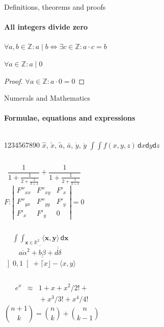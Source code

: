 \documentclass{beamer}
\begin{document}
  \begin{frame}[label=proof]{Definitions, theorems and proofs}
    \framesubtitle{All integers divide zero}
    \begin{definition}
      $\forall a,b\in\mathds{Z}: a\mid b\iff\exists c\in\mathds{Z}:a\cdot c=b$ 
    \end{definition}
    \begin{theorem}
      $\forall a\in\mathds{Z}: a\mid 0$
    \end{theorem}
    \begin{proof}[Proof\nopunct]
      $\forall a\in\mathds{Z}: a\cdot 0=0$
    \end{proof}
  \end{frame}

  \begin{frame}[label=math]{Numerals and Mathematics}
    \framesubtitle{Formulae, equations and expressions}
    \begin{columns}[onlytextwidth]
        1234567890
        $\hat{x}$, $\check{x}$, $\tilde{a}$, 
        $\bar{a}$, $\dot{y}$, $\ddot{y}$
        $\int \!\! \int f(x,y,z)\,\mathsf{d}x\mathsf{d}y\mathsf{d}z$
    \end{columns}
    \begin{columns}[onlytextwidth]
        $$\frac{1}{\displaystyle 1+
          \frac{1}{\displaystyle 2+
          \frac{1}{\displaystyle 3+x}}} +
          \frac{1}{1+\frac{1}{2+\frac{1}{3+x}}}$$
        $$F:\left| \begin{array}{ccc}
        F''_{xx} & F''_{xy} &  F'_x \\
        F''_{yx} & F''_{yy} &  F'_y \\
        F'_x     & F'_y     & 0 
        \end{array}\right| = 0$$
    \end{columns}
    \begin{columns}[onlytextwidth]
        $$\mathop{\int \!\!\! \int}_{\mathbf{x} \in \mathds{R}^2} 
        \! \langle \mathbf{x},\mathbf{y}\rangle\,\mathsf{d}\mathbf{x}$$
        $$\overline{\overline{a\alpha}^2+\underline{b\beta}
         +\overline{\overline{d\delta}}}$$
        $\left] 0,1\right[ + \lceil x \rfloor - \langle x,y\rangle$
    \end{columns}
    \begin{columns}[onlytextwidth]
        \begin{eqnarray*}
         e^x &\approx& 1+x+x^2/2! + \\
           && {}+x^3/3! + x^4/4!
        \end{eqnarray*}
        $${n+1\choose k} = {n\choose k} + {n \choose k-1}$$
    \end{columns}
  \end{frame}
\end{document}
